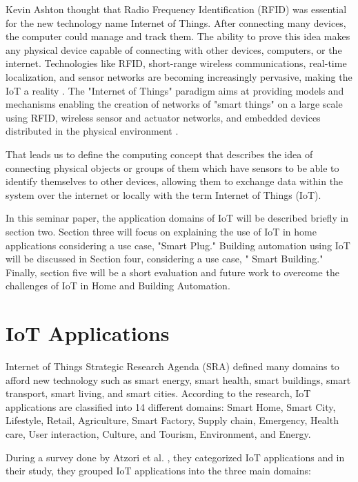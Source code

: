 \documentclass[conference]{IEEEtran}
\begin{document}
Kevin Ashton thought that Radio Frequency Identification (RFID)  was essential for the new technology name Internet of Things. After connecting many devices, the computer could manage and track them. The ability to prove this idea makes any physical device capable of connecting with other devices, computers, or the internet. Technologies like RFID, short-range wireless communications, real-time localization, and sensor networks are becoming increasingly pervasive, making the IoT a reality\cite{book } \cite{discovery}. The "Internet of Things" paradigm aims at providing models and mechanisms enabling the creation of networks of "smart things" on a large scale using RFID, wireless sensor and actuator networks, and embedded devices distributed in the physical environment \cite{RFID}.


That leads us to define the computing concept that describes the idea of connecting physical objects or groups of them which have sensors to be able to identify themselves to other devices, allowing them to exchange data within the system over the internet or locally with the term Internet of Things (IoT). \cite{por}

In this seminar paper, the application domains of IoT will be described briefly in section two. Section three will focus on explaining the use of IoT in home applications considering a use case, "Smart Plug." Building automation using IoT will be discussed in Section four, considering a use case, " Smart Building." Finally, section five will be a short evaluation and future work to overcome the challenges of IoT in Home and Building Automation.

\section{IoT Applications }


Internet of Things Strategic Research Agenda (SRA) \cite{SRA} defined many domains to afford new technology such as smart energy, smart health, smart buildings, smart transport, smart living, and smart cities\cite{por1}. According to the research, IoT applications are classified into 14 different domains: Smart Home, Smart City, Lifestyle, Retail, Agriculture, Smart Factory, Supply chain, Emergency, Health care, User interaction, Culture, and Tourism, Environment, and Energy. \cite{por2}


During a survey done by Atzori et al. \cite{azori}, they categorized
IoT applications and in their study, they grouped IoT applications   into the  three main domains: 
\end{document}
